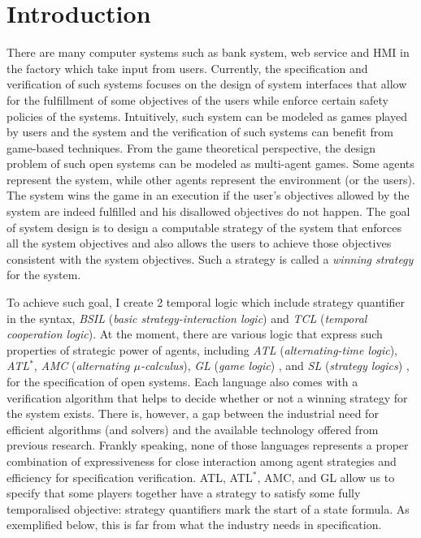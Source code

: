 \chapter{Introduction}
\label{c:intro}

There are many computer systems such as bank system, web service and HMI in the factory which take input from users.
Currently, the specification and verification of such systems focuses on the design of system interfaces that allow for the fulfillment of some objectives of the users while enforce certain safety policies of the systems.
Intuitively, such system can be modeled as games played by users and the system and the verification of such systems can benefit from game-based techniques.
From the game theoretical perspective, the design problem of such open systems can be modeled as multi-agent games.
Some agents represent the system, while other agents represent the environment (or the users).
The system wins the game in an execution if the user's objectives allowed by the system are indeed fulfilled and his disallowed objectives do not happen.
The goal of system design is to design a computable strategy of the system that 
enforces all the system objectives and also allows the users to achieve those objectives consistent with the system objectives.
Such a strategy is called a {\em winning strategy} for the system.  

To achieve such goal, I create 2 temporal logic which include strategy quantifier in the syntax, {\em BSIL} ({\em basic strategy-interaction logic}) and {\em TCL} ({\em temporal cooperation logic}).
At the moment, there are various logic that express such properties of strategic power of agents,
including {\em ATL} ({\em alternating-time logic}), 
{\em ATL}$^*$, {\em AMC} ({\em alternating $\mu$-calculus}),
{\em GL} ({\em game logic}) \cite{AHK02}, 
and {\em SL} ({\em strategy logics}) \cite{CLM10,CHP10,MMV10}, 
for the specification of open systems.  
Each language also comes with a verification algorithm that helps to decide whether or not a winning strategy for the system exists.
There is, however, a gap between the industrial need for efficient algorithms (and solvers) and the available technology offered from previous research.
Frankly speaking, none of those languages represents a proper combination of expressiveness for close interaction among agent strategies and efficiency for specification verification.  
ATL, ATL$^*$, AMC, and GL \cite{AHK02} allow us to specify that some players together have a strategy to satisfy some fully temporalised objective: strategy quantifiers mark the start of a state formula.
As exemplified below, this is far from what the industry needs in specification.  

